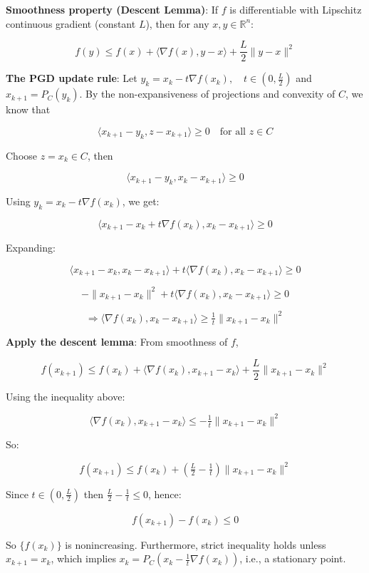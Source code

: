 \documentclass{ExerciseSheet}
\begin{document}
\begin{solution}
   \vskip 0.3cm  
\textbf{ Smoothness property (Descent Lemma)}: If $f$ is differentiable with Lipschitz continuous gradient (constant $L$), then for any $x, y \in \mathbb{R}^n$:

\[
f(y) \le f(x) + \langle \nabla f(x), y - x \rangle + \frac{L}{2}\|y - x\|^2
\]

\textbf{ The PGD update rule}: Let $y_k = x_k - t \nabla f(x_k), \quad t\in (0, \tfrac{L}{2})$ and $x_{k+1} = P_C(y_k)$.
\vskip 0.3cm
By the non-expansiveness of projections and convexity of $C$, we know that

\[
\langle x_{k+1} - y_k, z - x_{k+1} \rangle \ge 0 \quad \text{for all } z \in C
\]

Choose $z = x_k \in C$, then

\[
\langle x_{k+1} - y_k, x_k - x_{k+1} \rangle \ge 0
\]

Using $y_k = x_k - t \nabla f(x_k)$, we get:

\[
\langle x_{k+1} - x_k + t \nabla f(x_k), x_k - x_{k+1} \rangle \ge 0
\]

Expanding:

\[
\langle x_{k+1} - x_k, x_k - x_{k+1} \rangle + t \langle \nabla f(x_k), x_k - x_{k+1} \rangle \ge 0
\]

\[
-\|x_{k+1} - x_k\|^2 + t \langle \nabla f(x_k), x_k - x_{k+1} \rangle \ge 0
\]

\[
\Rightarrow \langle \nabla f(x_k), x_k - x_{k+1} \rangle \ge \tfrac{1}{t} \|x_{k+1} - x_k\|^2
\]

\textbf{ Apply the descent lemma}: From smoothness of $f$,

\[
f(x_{k+1}) \le f(x_k) + \langle \nabla f(x_k), x_{k+1} - x_k \rangle + \frac{L}{2}\|x_{k+1} - x_k\|^2
\]

Using the inequality above:

\[
\langle \nabla f(x_k), x_{k+1} - x_k \rangle \le -\tfrac{1}{t} \|x_{k+1} - x_k\|^2
\]

So:

\[
f(x_{k+1}) \le f(x_k) + \left(   \tfrac{L}{2} - \tfrac{1}{t}\right) \|x_{k+1} - x_k\|^2
\]

Since $t\in (0, \tfrac{L}{2})$ then $\tfrac{L}{2} - \tfrac{1}{t} \le 0$, hence:

\[
f(x_{k+1}) - f(x_k) \le 0 \]

So $\{f(x_k)\}$ is nonincreasing. Furthermore, strict inequality holds unless $x_{k+1} = x_k$, which implies $x_k = P_C(x_k - \tfrac{1}{t} \nabla f(x_k))$, i.e., a stationary point.


\end{solution}
\end{document}
